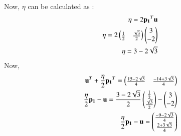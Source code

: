 \documentclass[journal,12pt,twocolumn]{IEEEtran}
\begin{document}
Now, $\eta$ can be calculated as : 
\begin{align}
\eta = 2 \mathbf{p_1}^T \mathbf{u}\\
\eta = 2 \begin{pmatrix}\frac{1}{2} & \frac{\sqrt{3}}{2}\end{pmatrix} \begin{pmatrix}3 \\ -2\end{pmatrix}\\
\eta =  3-2\sqrt{3}
\end{align}
Now, 
\begin{align}
\mathbf{u}^T + \frac{\eta}{2}\mathbf{p_1}^T = \begin{pmatrix}\frac{15-2\sqrt{3}}{4} & \frac{-14+3\sqrt{3}}{4}\end{pmatrix}\\
\frac{\eta}{2} \mathbf{p_1} -\mathbf{u}= \frac{3-2\sqrt{3}}{2}\begin{pmatrix}\frac{1}{2}\\ \frac{\sqrt{3}}{2} \end{pmatrix} - \begin{pmatrix}3\\-2\end{pmatrix}\\
\frac{\eta}{2} \mathbf{p_1} -\mathbf{u}=\begin{pmatrix}\frac{-9-2\sqrt{3}}{4}\\\frac{2+3\sqrt{3}}{4}\end{pmatrix}
\end{align}
\end{document}

